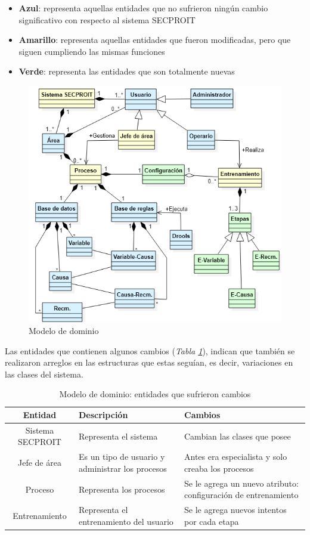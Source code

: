 \begin{itemize}
\item \textbf{Azul}: representa aquellas entidades que no sufrieron ningún cambio significativo con respecto al sistema SECPROIT
\item \textbf{Amarillo}: representa aquellas entidades que fueron modificadas, pero que siguen cumpliendo las mismas funciones
\item \textbf{Verde}: representa las entidades que son totalmente nuevas
\end{itemize}

\begin{figure}[h]
\centering
 \includegraphics[width=0.65\linewidth]{imagen/dominio.png}
 \caption{Modelo de dominio}
 \label{fig:dominio} 
\end{figure}

Las entidades que contienen algunos cambios (\textsl{Tabla \ref{tab:ent-amarilla}}), indican que también se realizaron arreglos en las estructuras que estas seguían, es decir, variaciones en las clases del sistema.

\begin{table}[H]
\begin{center}
\begin{tabular}{ | c | p{5cm} |  p{5.7cm} | }
\hline
\textbf{Entidad} & \textbf{Descripción} & \textbf{Cambios}\\
\hline
Sistema SECPROIT & Representa el sistema & Cambian las clases que posee \\
\hline
Jefe de área & Es un tipo de usuario y administrar los procesos & Antes era especialista y solo creaba los procesos \\
\hline
Proceso & Representa los procesos & Se le agrega un nuevo atributo: configuración de entrenamiento \\
\hline
Entrenamiento & Representa el entrenamiento del usuario & Se le agrega nuevos intentos por cada etapa \\
\hline
\end{tabular}
\caption{Modelo de dominio: entidades que sufrieron cambios}
\label{tab:ent-amarilla}
\end{center}
\end{table}

